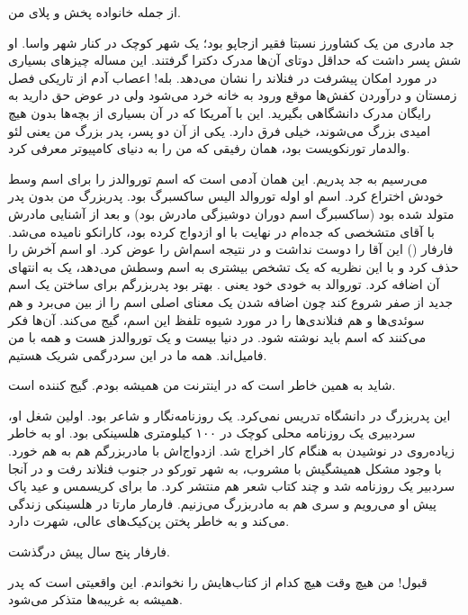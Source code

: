 از جمله خانواده پخش و پلای من. 

جد مادری من یک کشاورز نسبتا فقیر ازجاپو
بود؛ یک شهر کوچک در کنار شهر واسا. او شش
پسر داشت که حداقل دوتای آن‌ها مدرک دکترا گرفتند. این مساله چیزهای
بسیاری در مورد امکان پیشرفت در فنلاند را نشان می‌دهد. بله! اعصاب آدم از
تاریکی فصل زمستان و درآوردن کفش‌ها موقع ورود به خانه خرد می‌شود ولی در
عوض حق دارید به رایگان مدرک دانشگاهی بگیرید. این با آمریکا که در آن
بسیاری از بچه‌ها بدون هیچ امیدی بزرگ می‌شوند، خیلی فرق دارد. یکی از آن
دو پسر، پدر بزرگ من یعنی لئو والدمار تورنکویست بود، همان رفیقی که من
را به دنیای کامپیوتر معرفی کرد.

می‌رسیم به جد پدریم. این همان آدمی است که اسم توروالدز را برای اسم وسط
خودش اختراع کرد. اسم او اوله توروالد الیس ساکسبرگ بود. پدربزرگ من بدون پدر متولد شده بود
(ساکسبرگ اسم دوران دوشیزگی مادرش بود) و بعد از آشنایی مادرش با آقای
متشخصی که جده‌ام در نهایت با او ازدواج کرده بود،
کارانکو نامیده می‌شد. فارفار
() این آقا را دوست نداشت و در نتیجه اسم‌اش را عوض
کرد. او اسم آخرش را حذف کرد و با این نظریه که یک  تشخص بیشتری به اسم
وسطش می‌دهد، یک  به انتهای آن اضافه کرد. توروالد به خودی خود یعنی
. بهتر بود پدربزرگم برای ساختن یک اسم جدید از صفر
شروع کند چون اضافه شدن یک  معنای اصلی اسم را از بین می‌برد و هم
سوئدی‌ها و هم فنلاندی‌ها را در مورد شیوه تلفظ این اسم، گیج می‌کند. آن‌ها
فکر می‌کنند که اسم باید  نوشته شود. در دنیا بیست و یک
توروالدز هست و همه با من فامیل‌اند. همه ما در این سردرگمی شریک هستیم.

شاید به همین خاطر است که در اینترنت من همیشه 
بودم.  گیج کننده است.

این پدربزرگ در دانشگاه تدریس نمی‌کرد. یک روزنامه‌نگار و شاعر بود. اولین
شغل او، سردبیری یک روزنامه‌ محلی کوچک در ۱۰۰ کیلومتری هلسینکی بود. او
به خاطر زیاد‌ه‌روی در نوشیدن به هنگام کار اخراج شد. ازدواج‌اش با
مادربزرگم هم به هم خورد. با وجود مشکل همیشگیش با مشروب، به شهر
تورکو در جنوب فنلاند رفت و در آنجا سردبیر یک روزنامه
شد و چند کتاب شعر هم منتشر کرد. ما برای کریسمس و عید پاک پیش او می‌رویم
و سری هم به مادربزرگ می‌زنیم. فارمار مارتا در هلسینکی
زندگی می‌کند و به خاطر پختن پن‌کیک‌های عالی، شهرت دارد.

فارفار پنج سال پیش درگذشت.

قبول! من هیچ وقت هیچ کدام از کتاب‌هایش را نخواندم. این واقعیتی است که
پدر همیشه به غریبه‌ها متذکر می‌شود.


